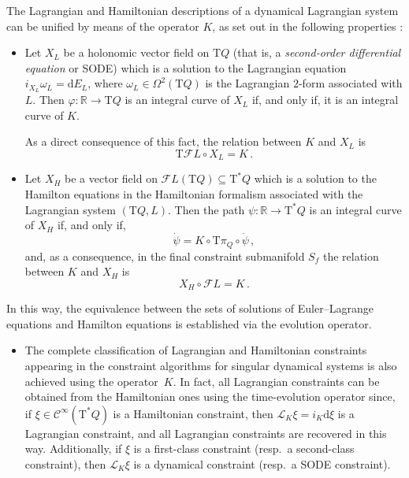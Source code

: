 \documentclass[11pt]{article}
\theoremstyle{plain}
\theoremstyle{definition}
\newcommand{\R}{\mathbb{R}}
\renewcommand{\d}{\mathrm{d}}
\newcommand{\Cinfty}{\mathscr{C}^\infty}
\newcommand{\T}{{\mathrm T}}
\newcommand{\cT}{\T^{\ast}}
\newcommand{\Lie}{\mathscr{L}}
\newcommand{\F}{\mathcal{F}}
\def\d{\mathrm{d}}
\def\d{\mathrm{d}}
\def\Lie{\mathscr{L}}
\begin{document}
The Lagrangian and Hamiltonian descriptions of a dynamical Lagrangian system can be unified by means of the operator $K$, as set out in the following properties
\cite{BGPR_86,BGPR_87,CL_87,GP_89}:
\begin{itemize}
\item 
Let $X_L$ be a holonomic vector field on $\T Q$ (that is, a {\sl second-order differential equation} or {\sc SODE}) which is a solution to the Lagrangian equation $i_{X_L}\omega_L=\d E_L$, where $\omega_L\in\Omega^2(\T Q)$ is the Lagrangian $2$-form associated with $L$.
Then $\varphi:\R\to\T Q$ is an
integral curve of $X_L$ if, and only if, it is an integral curve of $K$.

As a direct consequence of this fact, the relation between $K$ and $X_L$ is
\begin{equation}\label{K2a}
\T\F L \circ X_L = K \,.
\end{equation}
\item
Let $X_H$ be a vector field on $\F L(\T Q)\subseteq \cT Q$ which is a solution to the Hamilton equations in the Hamiltonian formalism associated with the Lagrangian system $(\T Q,L)$.  
Then the path $\psi:\R \to \cT Q$ is an integral curve of $X_H$ if, and only if,
\begin{equation}\label{K3}
\dot\psi = K\circ\T\pi_Q\circ\dot\psi \,,
\end{equation}
and, as a consequence, in the final constraint submanifold $S_f$ the relation between $K$ and $X_H$ is
\begin{equation}\label{K4}
    X_H \circ \F L = K \,.
\end{equation}
\end{itemize}
In this way, the equivalence between the
sets of solutions of Euler--Lagrange equations and Hamilton equations is established via the evolution operator.
\begin{itemize}
\item 
The complete classification of Lagrangian and Hamiltonian constraints
appearing in the constraint algorithms for singular dynamical systems
is also achieved using the operator~$K$. 
In fact, all Lagrangian constraints can be obtained from the Hamiltonian
ones using the time-evolution operator since,
if $\xi\in\Cinfty(\cT Q)$ is a Hamiltonian
constraint, then $\Lie_K\xi = i_{K}\d\xi $ is a Lagrangian constraint, and all Lagrangian constraints are recovered in this way.
Additionally, if $\xi$ is a first-class constraint (resp.\ a second-class constraint), then $\Lie_K\xi$ is a dynamical constraint (resp.\ a SODE constraint).
\end{itemize}
\end{document}
